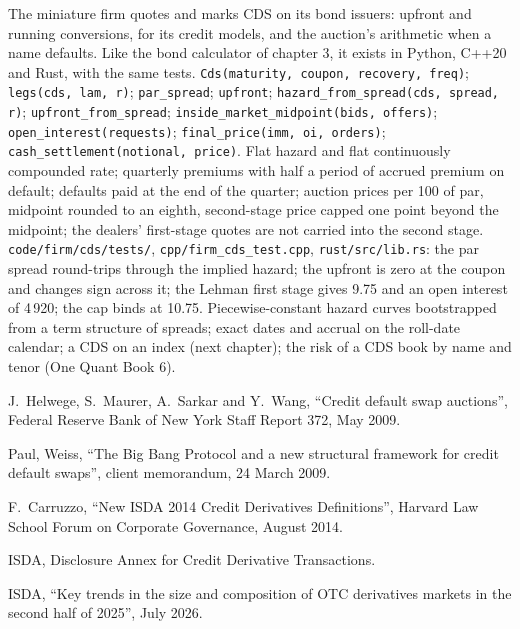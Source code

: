 \begin{build}
 The miniature firm quotes and marks CDS on its bond issuers: upfront
and running conversions,  for its credit models, and the auction's
arithmetic when a name defaults. Like the bond calculator of chapter 3, it exists in
Python, C++20 and Rust, with the same tests.
 \texttt{Cds(maturity, coupon, recovery, freq)};
\texttt{legs(cds, lam, r)}; \texttt{par\_spread}; \texttt{upfront};
\texttt{hazard\_from\_spread(cds, spread, r)}; \texttt{upfront\_from\_spread};
\texttt{inside\_market\_midpoint(bids, offers)}; \texttt{open\_interest(requests)};
\texttt{final\_price(imm, oi, orders)}; \texttt{cash\_settlement(notional, price)}.
 Flat hazard and flat continuously compounded rate; quarterly premiums
with half a period of accrued premium on default; defaults paid at the end of the
quarter; auction prices per 100 of par, midpoint rounded to an eighth, second-stage
price capped one point beyond the midpoint; the dealers' first-stage quotes are not
carried into the second stage.
 \texttt{code/firm/cds/tests/}, \texttt{cpp/firm\_cds\_test.cpp},
\texttt{rust/src/lib.rs}: the par spread round-trips through the implied hazard; the
upfront is zero at the coupon and changes sign across it; the Lehman first stage gives
9.75 and an open interest of 4\,920; the cap binds at 10.75.
 Piecewise-constant hazard curves bootstrapped from a term structure
of spreads; exact dates and accrual on the roll-date calendar; a CDS on an index
(next chapter); the risk of a CDS book by name and tenor (One Quant Book 6).
\end{build}

\begin{omsources}
\item J.~Helwege, S.~Maurer, A.~Sarkar and Y.~Wang, ``Credit default swap auctions'',
Federal Reserve Bank of New York Staff Report 372, May 2009.
\item Paul, Weiss, ``The Big Bang Protocol and a new structural framework for credit
default swaps'', client memorandum, 24 March 2009.
\item F.~Carruzzo, ``New ISDA 2014 Credit Derivatives Definitions'', Harvard Law School
Forum on Corporate Governance, August 2014.
\item ISDA, Disclosure Annex for Credit Derivative Transactions.
\item ISDA, ``Key trends in the size and composition of OTC derivatives markets in the
second half of 2025'', July 2026.
\end{omsources}

